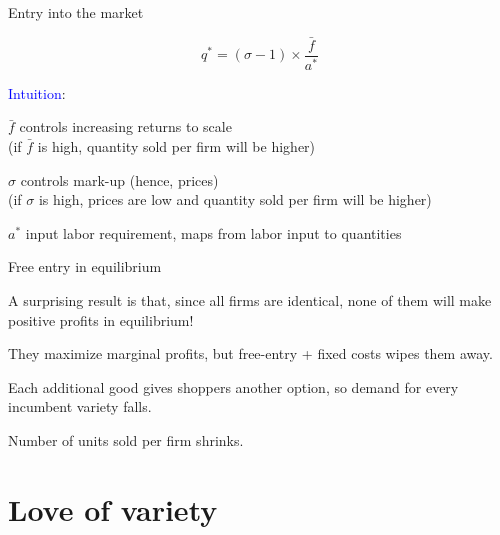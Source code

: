 \documentclass[notes,11pt, aspectratio=169, xcolor=table]{beamer}
\newcommand{\blue}[1]{\textcolor{blue}{#1}}
\newenvironment{wideitemize}{\itemize\addtolength{\itemsep}{10pt}}{\enditemize}
\begin{document}
\begin{frame}{Entry into the market}

 
    \begin{equation*}
    \boxed{
        q^* = (\sigma-1) \times \frac{\bar{f}}{a^*}
    }
    \end{equation*}

    \blue{Intuition}:
    \begin{wideitemize}

    \item<2-> $\bar{f}$ controls increasing returns to scale \\
        \qquad (if $\bar{f}$ is high, quantity sold per firm will be higher)

    \item<3-> $\sigma$ controls mark-up (hence, prices) \\
        \qquad (if $\sigma$ is high, prices are low and quantity sold per firm will be higher)

    \item<4-> $a^*$ input labor requirement, maps from labor input to quantities

    \end{wideitemize}
    
\end{frame}

\begin{frame}{Free entry in equilibrium}
    \begin{wideitemize}
        \item A surprising result is that, since all firms are identical, none of them will make positive profits in equilibrium!
        \item They maximize marginal profits, but free-entry + fixed costs wipes them away.
        \item Each additional good gives shoppers another option, so demand for every incumbent variety falls.
        \item Number of units sold per firm shrinks.
    \end{wideitemize}
\end{frame}

\section{Love of variety}
\end{document}
